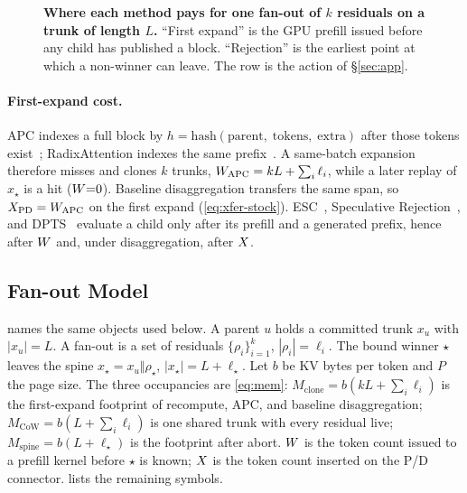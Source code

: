 \begin{figure}[t]
\centering
\resizebox{\textwidth}{!}{}
\caption{\textbf{Where each method pays for one fan-out of $k$ residuals on a trunk of length $L$.}
``First expand'' is the GPU prefill issued before any child has published a block.
``Rejection'' is the earliest point at which a non-winner can leave.
The \sys{} row is the action of \S\ref{sec:app}.}
\label{fig:trad}
\end{figure}

\paragraph{First-expand cost.}
APC indexes a full block by $h=\mathrm{hash}(\mathrm{parent},\;\mathrm{tokens},\;\mathrm{extra})$ after those tokens exist~\cite{vllm}; RadixAttention indexes the same prefix~\cite{sglang}.
A same-batch expansion therefore misses and clones $k$ trunks,
$W_{\mathrm{APC}}=kL+\sum_i\ell_i$,
while a later replay of $x_\star$ is a hit ($W{=}0$).
Baseline disaggregation transfers the same span, so $X_{\mathrm{PD}}=W_{\mathrm{APC}}$ on the first expand (\eqref{eq:xfer-stock}).
ESC~\cite{esc}, Speculative Rejection~\cite{specrej}, and DPTS~\cite{dpts} evaluate a child only after its prefill and a generated prefix, hence after $W$ and, under disaggregation, after $X$.

\subsection{Fan-out Model}
\label{sec:model}

 names the same objects used below.
A parent $u$ holds a committed trunk $x_u$ with $|x_u|{=}L$.
A fan-out is a set of residuals $\{\rho_i\}_{i=1}^{k}$, $|\rho_i|{=}\ell_i$.
The bound winner $\star$ leaves the spine $x_\star=x_u\Vert\rho_\star$, $|x_\star|{=}L{+}\ell_\star$.
Let $b$ be KV bytes per token and $P$ the page size.
The three occupancies are \eqref{eq:mem}:
$M_{\mathrm{clone}}=b(kL+\sum_i\ell_i)$ is the first-expand footprint of recompute, APC, and baseline disaggregation;
$M_{\mathrm{CoW}}=b(L+\sum_i\ell_i)$ is one shared trunk with every residual live;
$M_{\mathrm{spine}}=b(L+\ell_\star)$ is the footprint after abort.
$W$ is the token count issued to a prefill kernel before $\star$ is known;
$X$ is the token count inserted on the P/D connector.
 lists the remaining symbols.

